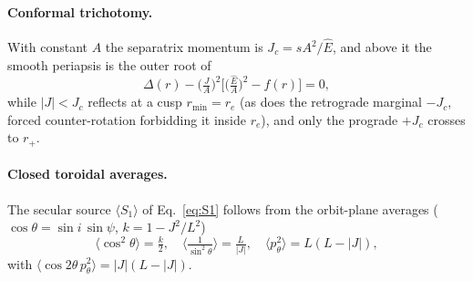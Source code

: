 \documentclass[12pt]{iopart}
\newcommand{\Ehat}{\hat E}
\newcommand{\rp}{r_{+}}
\newcommand{\re}{r_{e}}
\newcommand{\Jc}{J_{c}}
\begin{document}
\paragraph{Conformal trichotomy.} With constant $A$ the separatrix momentum is
$\Jc=sA^2/\Ehat$, and above it the smooth periapsis is the outer root of
\begin{equation}
    \Delta(r)-\Big(\tfrac{J}{A}\Big)^2\Big[\big(\tfrac{\Ehat}{A}\big)^2-f(r)\Big]=0,
    \label{eq:periapsis-root}
\end{equation}
while $|J|<\Jc$ reflects at a cusp $r_{\min}=\re$ (as does the retrograde
marginal $-\Jc$, forced counter-rotation forbidding it inside $\re$), and only
the prograde $+\Jc$ crosses to $\rp$.

\paragraph{Closed toroidal averages.} The secular source $\langle S_1\rangle$ of
Eq.~\eqref{eq:S1} follows from the orbit-plane averages ($\cos\theta=\sin i\,
\sin\psi$, $k=1-J^2/L^2$)
\begin{equation}
    \Big\langle\cos^2\theta\Big\rangle=\tfrac{k}{2},\quad
    \Big\langle\tfrac{1}{\sin^2\theta}\Big\rangle=\tfrac{L}{|J|},\quad
    \big\langle p_\theta^2\big\rangle=L(L-|J|),
    \label{eq:averages}
\end{equation}
with $\langle\cos2\theta\,p_\theta^2\rangle=|J|(L-|J|)$.
\end{document}
